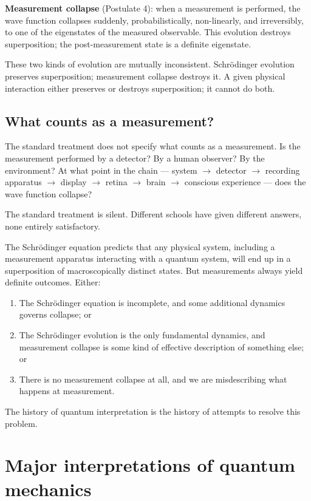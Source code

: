 \textbf{Measurement collapse} (Postulate 4): when a measurement is
performed, the wave function collapses suddenly, probabilistically,
non-linearly, and irreversibly, to one of the eigenstates of the
measured observable. This evolution destroys superposition; the
post-measurement state is a definite eigenstate.

These two kinds of evolution are mutually inconsistent. Schr\"odinger
evolution preserves superposition; measurement collapse destroys it.
A given physical interaction either preserves or destroys
superposition; it cannot do both.

\subsection{What counts as a measurement?}

The standard treatment does not specify what counts as a measurement.
Is the measurement performed by a detector? By a human observer? By
the environment? At what point in the chain --- system $\to$
detector $\to$ recording apparatus $\to$ display $\to$ retina $\to$
brain $\to$ conscious experience --- does the wave function collapse?

The standard treatment is silent. Different schools have given
different answers, none entirely satisfactory.

\begin{conceptbox}
\label{conc:measurement-problem}
The Schr\"odinger equation predicts that any physical system,
including a measurement apparatus interacting with a quantum system,
will end up in a superposition of macroscopically distinct states.
But measurements always yield definite outcomes. Either:
\begin{enumerate}[leftmargin=1.5em]
    \item The Schr\"odinger equation is incomplete, and some
    additional dynamics governs collapse; or
    \item The Schr\"odinger evolution is the only fundamental
    dynamics, and measurement collapse is some kind of effective
    description of something else; or
    \item There is no measurement collapse at all, and we are
    misdescribing what happens at measurement.
\end{enumerate}
The history of quantum interpretation is the history of attempts to
resolve this problem.
\end{conceptbox}

\section{Major interpretations of quantum mechanics}
\label{sec:interpretations}


